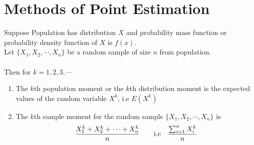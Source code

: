 \section[Methods of Point Estimation]{Methods of Point Estimation}
Suppose Population has distribution $X$ and probability mass function or probability density function of $X$ is $f(x)$.\\
Let $\{X_1,X_2,\cdots,X_n\}$ be a random sample of size $n$ from population.\\
\hfill\\
Then for $k=1,2,3,\cdots$\begin{enumerate}
\item The $k$th population moment or the $k$th distribution moment is the expected values of the random variable $X^k$, i.e $E(X^k)$
\item The $k$th sample moment for the random sample $\{X_1,X_2,\cdots,X_n\}$ is \begin{align*}
\frac{X_1^k+X_2^k+\cdots+X_n^k}{n} \text{\qquad i.e\quad}\frac{\sum_{i=1}^nX_i^k}{n}
\end{align*}
\end{enumerate}

